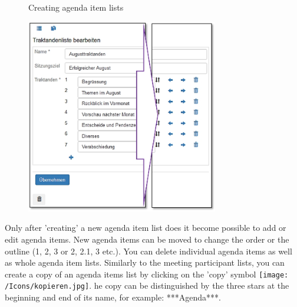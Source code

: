 \begin{figure}[H]
\caption{Creating agenda item lists}
\end{figure}

\begin{figure}
\vspace{-15pt}
\includegraphics[height=85mm]{../chapters/13_Konfigurationen/pictures/13-10_TraktandenlistenBearbeiten.jpg}
\end{figure}

Only after 'creating' a new agenda item list does it become possible to add or edit agenda items. New agenda items can be moved to change the order or the outline (1, 2, 3 or 2, 2.1, 3 etc.). You can delete individual agenda items as well as whole agenda item lists. Similarly to the meeting participant lists, you can create a copy of an agenda items list by clicking on the 'copy' symbol \texttt{[image: /Icons/kopieren.jpg]}. he copy can be distinguished by the three stars at the beginning and end of its name, for example: ***Agenda***.
